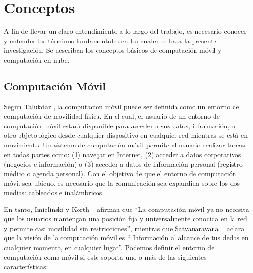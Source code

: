 
\chapter{Conceptos} %

\label{Chapter2} %



A fin de llevar un claro entendimiento a lo largo del trabajo, es necesario conocer y entender los términos fundamentales en los cuales 
se basa la presente investigación. Se describen los conceptos básicos de computación móvil y computación en nube.

\section{Computación Móvil}

Según Talukdar \cite{talukdar2010mobile}, la computación móvil puede ser definida como un entorno de computación de movilidad física.
En el cual, el usuario de un entorno de computación 
móvil estará disponible para acceder a sus datos, información, u otro objeto lógico desde cualquier dispositivo en cualquier red mientras se 
está en movimiento. Un sistema de computación móvil permite al usuario realizar tareas en todas partes como: (1) navegar en Internet,
(2) acceder a datos corporativos (negocios e información) o (3) acceder a datos de información personal (registro médico o agenda personal). 
Con el objetivo de que el entorno de computación móvil sea ubicuo, es necesario que la comunicación sea expandida sobre los dos medios:
cableados e inalámbricos. 

En tanto, Imielinski y Korth ~\cite{raey} afirman que ``La computación móvil ya no necesita que los usuarios mantengan una posición fija y universalmente 
conocida en la red y permite casi movilidad sin restricciones'', mientras que Satyanarayana ~\cite{Satyanarayanan:2011:MCN:2016598.2016600} aclara 
que la visión de la computación móvil es `` Información al alcance de tus dedos en cualquier momento, en cualquier lugar''. Podemos definir
el entorno de computación como móvil si este soporta uno o más de las siguientes características\cite{talukdar2010mobile}: 

